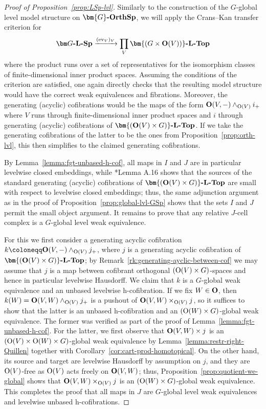 \documentclass[reqno]{memo-l}
\theoremstyle{mythm}
\theoremstyle{definition}
\numberwithin{equation}{section}
\DeclareMathOperator{\ev}{ev}
\newcommand{\cat}[1]{\textbf{\textup{#1}}}
\renewcommand{\O}{{\textup{O}}}
\let\smashp=\wedge
\newcommand{\Gosp}[1]{\cat{$\bm{#1}$-OrthSp}}
\begin{document}
\begin{proof}[Proof of Proposition~\ref{prop:LSp-lvl}]
    Similarly to the construction of the $G$-global level model structure on $\Gosp{G}$, we will apply the Crans--Kan transfer criterion for
    \begin{equation}\label{eq:LSp-transfer-RA}
        \cat{$\bm G$-$\cat{L}$-Sp}\xrightarrow{(\ev_V)_V}\prod_V\cat{$\bm{(G\times \O(V))}$-$\cat{L}$-Top}
    \end{equation}
    where the product runs over a set of representatives for the isomorphism classes of finite-dimensional inner product spaces. Assuming the conditions of the criterion are satisfied, one again directly checks that the resulting model structure would have the correct weak equivalences and fibrations. Moreover, the generating (acyclic) cofibrations would be the maps of the form $\cat{O}(V,-)\smashp_{\O(V)}i_+$ where $V$ runs through finite-dimensional inner product spaces and $i$ through generating (acyclic) cofibrations of $\cat{$\bm{(\O(V)\times G)}$-$\cat{L}$-Top}$. If we take the generating cofibrations of the latter to be the ones from Proposition~\ref{prop:orth-lvl}, this then simplifies to the claimed generating cofibrations.
    
    By Lemma~\ref{lemma:fgt-unbased-h-cof}, all maps in $I$ and $J$ are in particular levelwise closed embeddings, while \cite{barrero2021}*{Lemma A.16} shows that the sources of the standard generating (acyclic) cofibrations of $\cat{$\bm{(\O(V)\times G)}$-\cat{L}-Top}$ are small with respect to levelwise closed embeddings; thus, the same adjunction argument as in the proof of Proposition~\ref{prop:global-lvl-GSp} shows that the sets $I$ and $J$ permit the small object argument. It remains to prove that any relative $J$-cell complex is a $G$-global level weak equivalence.
    
    For this we first consider a generating acyclic cofibration $k\coloneqq\cat{O}(V,-)\smashp_{\O(V)}j_+$, where $j$ is a generating acyclic cofibration of $\cat{$\bm{(\O(V)\times G)}$-$\cat{L}$-Top}$; by Remark~\ref{rk:generating-ayclic-between-cof} we may assume that $j$ is a map between cofibrant orthogonal $(\O(V)\times G)$-spaces and hence in particular levelwise Hausdorff. We claim that $k$ is a $G$-global weak equivalence and an unbased levelwise h-cofibration. If we fix $W\in\cat{O}$, then $k(W)=\cat{O}(V,W)\smashp_{\O(V)}j_+$ is a pushout of $\cat{O}(V,W)\times_{\O(V)}j$, so it suffices to show that the latter is an unbased h-cofibration and an $(\O(W)\times G)$-global weak equivalence. The former was verified as part of the proof of Lemma~\ref{lemma:fgt-unbased-h-cof}. For the latter, we first observe that $\cat{O}(V,W)\times j$ is an $(\O(V)\times\O(W)\times G)$-global weak equivalence by Lemma~\ref{lemma:restr-right-Quillen} together with Corollary~\ref{cor:cart-prod-homotopical}. On the other hand, its source and target are levelwise Hausdorff by assumption on $j$, and they are $\O(V)$-free as $\O(V)$ acts freely on $\cat{O}(V,W)$; thus, Proposition~\ref{prop:quotient-we-global} shows that $\cat{O}(V,W)\times_{\O(V)}j$ is an $(\O(W)\times G)$-global weak equivalence. This completes the proof that all maps in $J$ are $G$-global level weak equivalences and levelwise unbased h-cofibrations.
    

\end{proof}
\end{document}
